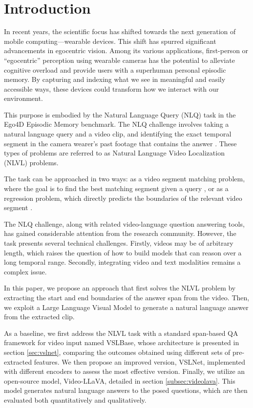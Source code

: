 \documentclass[10pt,twocolumn,letterpaper]{article}
\begin{document}
\section{Introduction}
In recent years, the scientific focus has shifted towards the next generation of mobile computing—wearable devices. This shift has spurred significant advancements in egocentric vision. Among its various applications, first-person or “egocentric” perception using wearable cameras has the potential to alleviate cognitive overload and provide users with a superhuman personal episodic memory. By capturing and indexing what we see in meaningful and easily accessible ways, these devices could transform how we interact with our environment.

This purpose is embodied by the Natural Language Query (NLQ) task in the Ego4D Episodic Memory benchmark. The NLQ challenge involves taking a natural language query and a video clip, and identifying the exact temporal segment in the camera wearer's past footage that contains the answer \cite{b1}. These types of problems are referred to as Natural Language Video Localization (NLVL) problems.

The task can be approached in two ways: as a video segment matching problem, where the goal is to find the best matching segment given a query \cite{b2}, or as a regression problem, which directly predicts the boundaries of the relevant video segment \cite{b3}.

The NLQ challenge, along with related video-language question answering tools, has gained considerable attention from the research community. However, the task presents several technical challenges. Firstly, videos may be of arbitrary length, which raises the question of how to build models that can reason over a long temporal range. Secondly, integrating video and text modalities remains a complex issue.

In this paper, we propose an approach that first solves the NLVL problem by extracting the start and end boundaries of the answer span from the video. Then, we exploit a Large Language Visual Model to generate a natural language answer from the extracted clip.

As a baseline, we first address the NLVL task with a standard span-based QA framework for video input named VSLBase, whose architecture is presented in section \ref{sec:vslnet}, comparing the outcomes obtained using different sets of pre-extracted features. We then propose an improved version, VSLNet, implemented with different encoders to assess the most effective version. Finally, we utilize an open-source model, Video-LLaVA, detailed in section \ref{subsec:videolava}. This model generates natural language answers to the posed questions, which are then evaluated both quantitatively and qualitatively.
\end{document}
